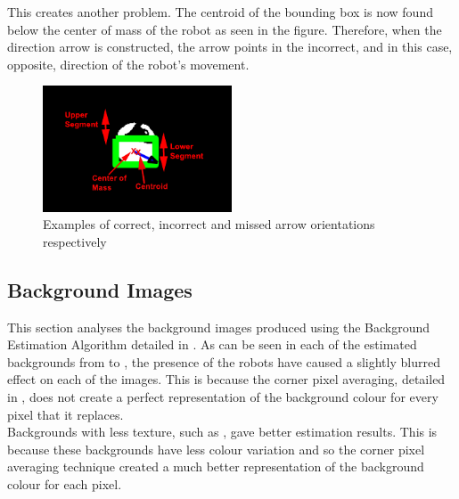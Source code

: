 \documentclass{article}
\begin{document}
This creates another problem. The centroid of the bounding box is now found below the center of mass of the robot as seen in the figure. Therefore, when the direction arrow is constructed, the arrow points in the incorrect, and in this case, opposite, direction of the robot's movement.\\ 

  \begin{figure}[h!]
	\centering
		\includegraphics[width=0.5\textwidth]{../Drawings/IncorrectDirectionResults.pdf}
	\caption{Examples of correct, incorrect and missed arrow orientations respectively}
	\label{fig:indetect}
\end{figure}

\subsection{Background Images}
\label{sec:back}
This section analyses the background images produced using the Background Estimation Algorithm detailed in . As can be seen in each of the estimated backgrounds from  to , the presence of the robots have caused a slightly blurred effect on each of the images. This is because the corner pixel averaging, detailed in , does not create a perfect representation of the background colour for every pixel that it replaces.\\

Backgrounds with less texture, such as , gave better estimation results. This is because these backgrounds have less colour variation and so the corner pixel averaging technique created a much better representation of the background colour for each pixel.\\
\end{document}
